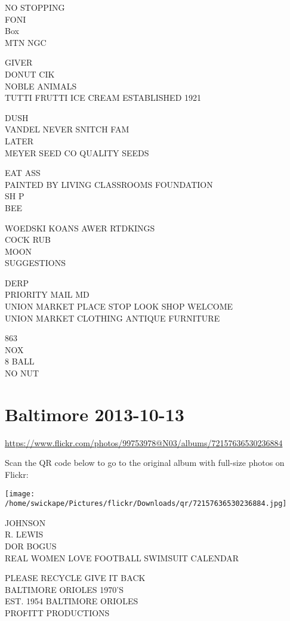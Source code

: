 \documentclass[10pt,letterpaper]{article}
\begin{document}
NO STOPPING\\
FONI\\
Box\\
MTN NGC

GIVER\\
DONUT CIK\\
NOBLE ANIMALS\\
TUTTI FRUTTI ICE CREAM ESTABLISHED 1921

DUSH\\
VANDEL NEVER SNITCH FAM\\
LATER\\
MEYER SEED CO QUALITY SEEDS

EAT ASS\\
PAINTED BY LIVING CLASSROOMS FOUNDATION\\
SH P\\
BEE

WOEDSKI KOANS AWER RTDKINGS\\
COCK RUB\\
MOON\\
SUGGESTIONS

DERP\\
PRIORITY MAIL MD\\
UNION MARKET PLACE STOP LOOK SHOP WELCOME\\
UNION MARKET CLOTHING ANTIQUE FURNITURE

863\\
NOX\\
8 BALL\\
NO NUT


\section*{Baltimore 2013-10-13}

\url{https://www.flickr.com/photos/99753978@N03/albums/72157636530236884}

Scan the QR code below to go to the original album with full-size photos on Flickr:

\texttt{[image: /home/swickape/Pictures/flickr/Downloads/qr/72157636530236884.jpg]}


JOHNSON\\
R. LEWIS\\
DOR BOGUS\\
REAL WOMEN LOVE FOOTBALL SWIMSUIT CALENDAR

PLEASE RECYCLE GIVE IT BACK\\
BALTIMORE ORIOLES 1970'S\\
EST. 1954 BALTIMORE ORIOLES\\
PROFITT PRODUCTIONS
\end{document}
